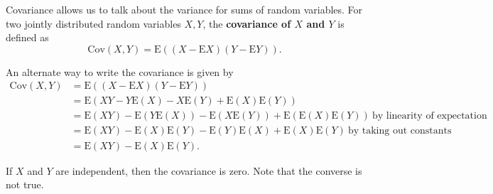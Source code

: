 \documentclass[a4paper,10pt]{article}
\newcommand{\E}{\mathrm{E}}
\newcommand{\Cov}{\mathrm{Cov}}
\begin{document}
Covariance allows us to talk about the variance for sums of random variables. For two jointly distributed random variables $X, Y$, the \textbf{covariance of $X$ and $Y$} is defined as 
\begin{equation*}
    \Cov (X, Y) = \E((X - \E X)(Y - \E Y)).
\end{equation*}

An alternate way to write the covariance is given by 
\begin{align*}
    \Cov (X, Y) &= \E((X - \E X)(Y - \E Y)) \\
                &= \E(XY - Y\E(X) - X\E(Y) + \E(X)\E(Y)) \\
                &= \E(XY) - \E(Y\E(X)) - \E(X \E(Y)) + \E(\E(X) \E(Y))~\text{by linearity of expectation} \\
                &= \E(XY) - \E(X)\E(Y) - \E(Y)\E(X) + \E(X)\E(Y)~\text{by taking out constants} \\
                &= \E(XY) - \E(X)\E(Y).
\end{align*}

If $X$ and $Y$ are independent, then the covariance is zero. Note that the converse is not true. 
\end{document}
